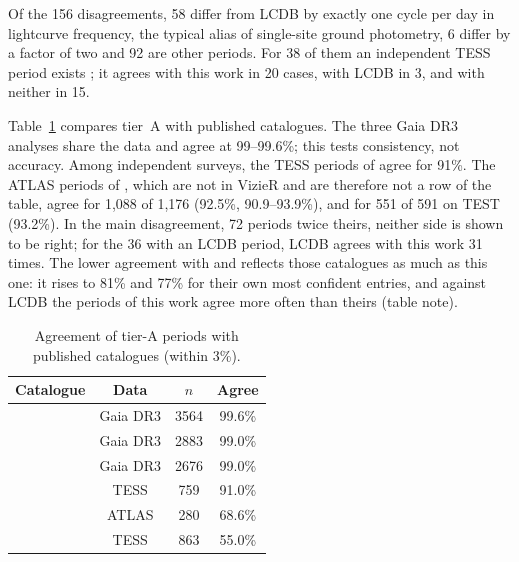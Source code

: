 Of the 156 disagreements, 58 differ from LCDB by exactly one cycle per day in lightcurve frequency, the
typical alias of single-site ground photometry, 6 differ by a factor of two and 92 are other periods. For 38
of them an independent TESS period exists \citep{Vavilov2025}; it agrees with this work in 20 cases, with
LCDB in 3, and with neither in 15.

Table~\ref{tab:lit} compares tier~A with published catalogues. The three Gaia DR3 analyses share the data
and agree at 99--99.6\%; this tests consistency, not accuracy. Among independent surveys, the TESS periods
of \citet{Vavilov2025} agree for 91\%. The ATLAS periods of \citet{Durech2022}, which are not in VizieR and
are therefore not a row of the table, agree for 1{,}088 of 1{,}176 (92.5\%, 90.9--93.9\%), and for 551 of 591
on TEST (93.2\%). In the main disagreement, 72 periods twice theirs, neither side is shown to be right; for
the 36 with an LCDB period, LCDB agrees with this work 31 times. The lower agreement with
\citet{Erasmus2020} and \citet{McNeill2023} reflects those catalogues as much as this one: it rises to 81\%
and 77\% for their own most confident entries, and against LCDB the periods of this work agree more often
than theirs (table note).

\begin{table}
\centering
\caption{Agreement of tier-A periods with published catalogues (within 3\%).}\label{tab:lit}
\begin{tabular}{lccc}
\hline
Catalogue & Data & $n$ & Agree \\
\hline
\citet{Durech2023} & Gaia DR3 & 3564 & 99.6\% \\
\citet{Cellino2024} & Gaia DR3 & 2883 & 99.0\% \\
\citet{MacLennan2026} & Gaia DR3 & 2676 & 99.0\% \\
\citet{Vavilov2025} & TESS & 759 & 91.0\% \\
\citet{Erasmus2020} & ATLAS & 280 & 68.6\% \\
\citet{McNeill2023} & TESS & 863 & 55.0\% \\
\hline
\end{tabular}

\par{}
\end{table}

